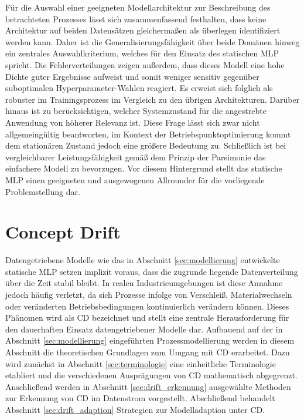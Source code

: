 Für die Auswahl einer geeigneten Modellarchitektur zur Beschreibung des betrachteten Prozesses lässt sich zusammenfassend festhalten, dass keine Architektur auf beiden Datensätzen gleichermaßen als überlegen identifiziert werden kann. Daher ist die Generalisierungsfähigkeit über beide Domänen hinweg ein zentrales Auswahlkriterium, welches für den Einsatz des statischen \ac{MLP} spricht. Die Fehlerverteilungen zeigen außerdem, dass dieses Modell eine hohe Dichte guter Ergebnisse aufweist und somit weniger sensitiv gegenüber suboptimalen Hyperparameter-Wahlen reagiert. Es erweist sich folglich als robuster im Trainingsprozess im Vergleich zu den übrigen Architekturen.
Darüber hinaus ist zu berücksichtigen, welcher Systemzustand für die angestrebte Anwendung von höherer Relevanz ist. Diese Frage lässt sich zwar nicht allgemeingültig beantworten, im Kontext der Betriebspunktoptimierung kommt dem stationären Zustand jedoch eine größere Bedeutung zu. Schließlich ist bei vergleichbarer Leistungsfähigkeit gemäß dem Prinzip der Parsimonie das einfachere Modell zu bevorzugen. Vor diesem Hintergrund stellt das statische \ac{MLP} einen geeigneten und ausgewogenen Allrounder für die vorliegende Problemstellung dar.
%
\section{Concept Drift} \label{sec:concept_drift}
Datengetriebene Modelle wie das in Abschnitt \ref{sec:modellierung} entwickelte statische \ac{MLP} setzen implizit voraus, dass die zugrunde liegende Datenverteilung über die Zeit stabil bleibt. In realen Industrieumgebungen ist diese Annahme jedoch häufig verletzt, da sich Prozesse infolge von Verschleiß, Materialwechseln oder veränderten Betriebsbedingungen kontinuierlich verändern können. Dieses Phänomen wird als \ac{CD} bezeichnet und stellt eine zentrale Herausforderung für den dauerhaften Einsatz datengetriebener Modelle dar.
Aufbauend auf der in Abschnitt \ref{sec:modellierung} eingeführten Prozessmodellierung werden in diesem Abschnitt die theoretischen Grundlagen zum Umgang mit \ac{CD} erarbeitet. Dazu wird zunächst in Abschnitt \ref{sec:terminologie} eine einheitliche Terminologie etabliert und die verschiedenen Ausprägungen von \ac{CD} mathematisch abgegrenzt. Anschließend werden in Abschnitt \ref{sec:drift_erkennung} ausgewählte Methoden zur Erkennung von \ac{CD} im Datenstrom vorgestellt. Abschließend behandelt Abschnitt \ref{sec:drift_adaption} Strategien zur Modelladaption unter \ac{CD}.
%
